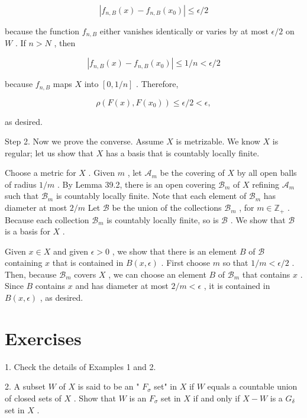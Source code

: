 \documentclass[10pt]{article}
\begin{document}
\[
\left| {{f}_{n,B}\left( x\right)  - {f}_{n,B}\left( {x}_{0}\right) }\right|  \leq  \epsilon /2
\]

because the function \({f}_{n,B}\) either vanishes identically or varies by at most \(\epsilon /2\) on \(W\) . If \(n > N\) , then

\[
\left| {{f}_{n,B}\left( x\right)  - {f}_{n,B}\left( {x}_{0}\right) }\right|  \leq  1/n < \epsilon /2
\]

because \({f}_{n,B}\) maps \(X\) into \(\left\lbrack  {0,1/n}\right\rbrack\) . Therefore,

\[
\rho \left( {F\left( x\right) ,F\left( {x}_{0}\right) }\right)  \leq  \epsilon /2 < \epsilon ,
\]

as desired.

Step 2. Now we prove the converse. Assume \(X\) is metrizable. We know \(X\) is regular; let us show that \(X\) has a basis that is countably locally finite.

Choose a metric for \(X\) . Given \(m\) , let \({\mathcal{A}}_{m}\) be the covering of \(X\) by all open balls of radius \(1/m\) . By Lemma 39.2, there is an open covering \({\mathcal{B}}_{m}\) of \(X\) refining \({\mathcal{A}}_{m}\) such that \({\mathcal{B}}_{m}\) is countably locally finite. Note that each element of \({\mathcal{B}}_{m}\) has diameter at most \(2/m\) Let \(\mathcal{B}\) be the union of the collections \({\mathcal{B}}_{m}\) , for \(m \in  {\mathbb{Z}}_{ + }\) . Because each collection \({\mathcal{B}}_{m}\) is countably locally finite, so is \(\mathcal{B}\) . We show that \(\mathcal{B}\) is a basis for \(X\) .

Given \(x \in  X\) and given \(\epsilon  > 0\) , we show that there is an element \(B\) of \(\mathcal{B}\) containing \(x\) that is contained in \(B\left( {x,\epsilon }\right)\) . First choose \(m\) so that \(1/m < \epsilon /2\) . Then, because \({\mathcal{B}}_{m}\) covers \(X\) , we can choose an element \(B\) of \({\mathcal{B}}_{m}\) that contains \(x\) . Since \(B\) contains \(x\) and has diameter at most \(2/m < \epsilon\) , it is contained in \(B\left( {x,\epsilon }\right)\) , as desired.

\section*{Exercises}

1. Check the details of Examples 1 and 2.

2. A subset \(W\) of \(X\) is said to be an " \({F}_{\sigma }\) set" in \(X\) if \(W\) equals a countable union of closed sets of \(X\) . Show that \(W\) is an \({F}_{\sigma }\) set in \(X\) if and only if \(X - W\) is a \({G}_{\delta }\) set in \(X\) .
\end{document}
